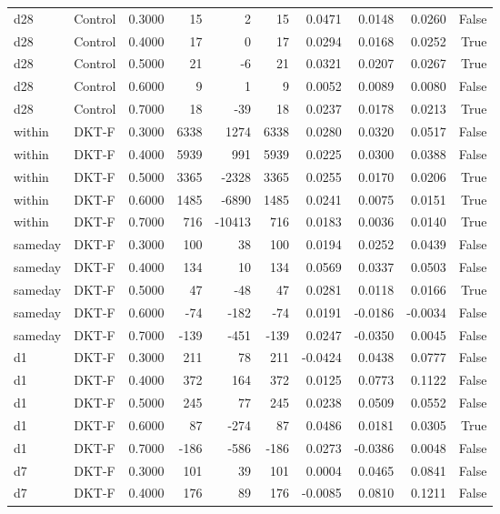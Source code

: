\begin{tabular}{llrrrrrrrr}
d28 & Control & 0.3000 & 15 & 2 & 15 & 0.0471 & 0.0148 & 0.0260 & False \\
d28 & Control & 0.4000 & 17 & 0 & 17 & 0.0294 & 0.0168 & 0.0252 & True \\
d28 & Control & 0.5000 & 21 & -6 & 21 & 0.0321 & 0.0207 & 0.0267 & True \\
d28 & Control & 0.6000 & 9 & 1 & 9 & 0.0052 & 0.0089 & 0.0080 & False \\
d28 & Control & 0.7000 & 18 & -39 & 18 & 0.0237 & 0.0178 & 0.0213 & True \\
within & DKT-F & 0.3000 & 6338 & 1274 & 6338 & 0.0280 & 0.0320 & 0.0517 & False \\
within & DKT-F & 0.4000 & 5939 & 991 & 5939 & 0.0225 & 0.0300 & 0.0388 & False \\
within & DKT-F & 0.5000 & 3365 & -2328 & 3365 & 0.0255 & 0.0170 & 0.0206 & True \\
within & DKT-F & 0.6000 & 1485 & -6890 & 1485 & 0.0241 & 0.0075 & 0.0151 & True \\
within & DKT-F & 0.7000 & 716 & -10413 & 716 & 0.0183 & 0.0036 & 0.0140 & True \\
sameday & DKT-F & 0.3000 & 100 & 38 & 100 & 0.0194 & 0.0252 & 0.0439 & False \\
sameday & DKT-F & 0.4000 & 134 & 10 & 134 & 0.0569 & 0.0337 & 0.0503 & False \\
sameday & DKT-F & 0.5000 & 47 & -48 & 47 & 0.0281 & 0.0118 & 0.0166 & True \\
sameday & DKT-F & 0.6000 & -74 & -182 & -74 & 0.0191 & -0.0186 & -0.0034 & False \\
sameday & DKT-F & 0.7000 & -139 & -451 & -139 & 0.0247 & -0.0350 & 0.0045 & False \\
d1 & DKT-F & 0.3000 & 211 & 78 & 211 & -0.0424 & 0.0438 & 0.0777 & False \\
d1 & DKT-F & 0.4000 & 372 & 164 & 372 & 0.0125 & 0.0773 & 0.1122 & False \\
d1 & DKT-F & 0.5000 & 245 & 77 & 245 & 0.0238 & 0.0509 & 0.0552 & False \\
d1 & DKT-F & 0.6000 & 87 & -274 & 87 & 0.0486 & 0.0181 & 0.0305 & True \\
d1 & DKT-F & 0.7000 & -186 & -586 & -186 & 0.0273 & -0.0386 & 0.0048 & False \\
d7 & DKT-F & 0.3000 & 101 & 39 & 101 & 0.0004 & 0.0465 & 0.0841 & False \\
d7 & DKT-F & 0.4000 & 176 & 89 & 176 & -0.0085 & 0.0810 & 0.1211 & False \\

\end{tabular}
